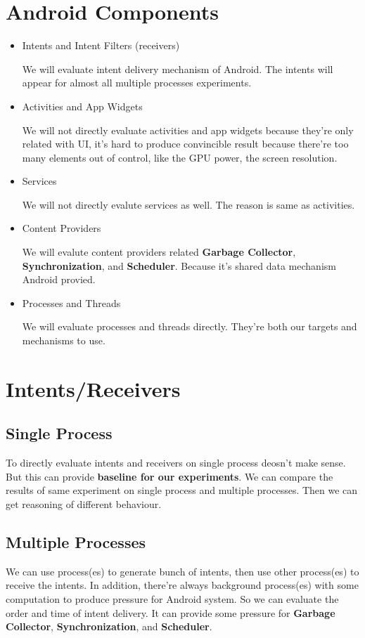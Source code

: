 \documentclass[11pt]{article}
\begin{document}
\section{Android Components}
\label{sec-2}
\begin{itemize}
\item Intents and Intent Filters (receivers)

We will evaluate intent delivery mechanism of Android.
The intents will appear for almost all multiple processes experiments.

\item Activities and App Widgets

We will not directly evaluate activities and app widgets because they're only related with UI,
it's hard to produce convincible result because there're too many elements out of control,
like the GPU power, the screen resolution.

\item Services

We will not directly evalute services as well. The reason is same as activities.
\item Content Providers

We will evalute content providers related \textbf{Garbage Collector}, \textbf{Synchronization},
and \textbf{Scheduler}. Because it's shared data mechanism Android provied.
\end{itemize}


\begin{itemize}
\item Processes and Threads

We will evaluate processes and threads directly.
They're both our targets and mechanisms to use.
\end{itemize}

\section{Intents/Receivers}
\label{sec-3}
\subsection{Single Process}
\label{sec-3-1}
To directly evaluate intents and receivers on
single process deosn't make sense.
But this can provide \textbf{baseline for our experiments}.
We can compare the results of same experiment on single process
and multiple processes.
Then we can get reasoning of different behaviour.

\subsection{Multiple Processes}
\label{sec-3-2}
We can use process(es) to generate bunch of intents, then use other
process(es) to receive the intents.
In addition, there're always background process(es) with some computation
to produce pressure for Android system.
So we can evaluate the order and time of intent delivery.
It can provide some pressure for \textbf{Garbage Collector}, \textbf{Synchronization}, and \textbf{Scheduler}.
\end{document}
